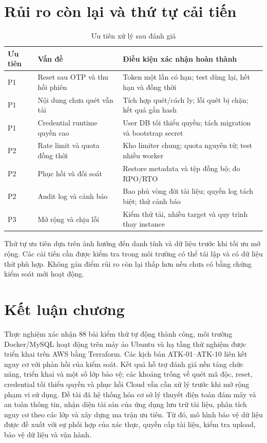 \section{Rủi ro còn lại và thứ tự cải tiến}
\begin{table}[htbp]\centering\small
\caption{Ưu tiên xử lý sau đánh giá}
\begin{tabularx}{\textwidth}{P{1.6cm}P{4.2cm}X}\toprule
\textbf{Ưu tiên}&\textbf{Vấn đề}&\textbf{Điều kiện xác nhận hoàn thành}\\\midrule
P1 & Reset sau OTP và thu hồi phiên & Token một lần có hạn; test dùng lại, hết hạn và đồng thời\\
P1 & Nội dung chưa quét vẫn tải & Tích hợp quét/cách ly; lỗi quét bị chặn; kết quả gắn hash\\
P1 & Credential runtime quyền cao & User DB tối thiểu quyền; tách migration và bootstrap secret\\
P2 & Rate limit và quota đồng thời & Kho limiter chung; quota nguyên tử; test nhiều worker\\
P2 & Phục hồi và đối soát & Restore metadata và tệp đồng bộ; đo RPO/RTO\\
P2 & Audit log và cảnh báo & Bao phủ vòng đời tài liệu; quyền log tách biệt; thử cảnh báo\\
P3 & Mở rộng và chịu lỗi & Kiểm thử tải, nhiều target và quy trình thay instance\\\bottomrule
\end{tabularx}\end{table}
Thứ tự ưu tiên dựa trên ảnh hưởng đến danh tính và dữ liệu trước khi tối ưu mở rộng. Các cải tiến cần được kiểm tra trong môi trường có thể tái lập và có dữ liệu thử phù hợp. Không gán điểm rủi ro còn lại thấp hơn nếu chưa có bằng chứng kiểm soát mới hoạt động.

\section{Kết luận chương}
Thực nghiệm xác nhận 88 bài kiểm thử tự động thành công, môi trường Docker/MySQL hoạt động trên máy ảo Ubuntu và hạ tầng thử nghiệm được triển khai trên AWS bằng Terraform. Các kịch bản ATK-01--ATK-10 liên kết nguy cơ với phản hồi của kiểm soát. Kết quả hỗ trợ đánh giá nền tảng chức năng, triển khai và một số lớp bảo vệ; các khoảng trống về quét mã độc, reset, credential tối thiểu quyền và phục hồi Cloud vẫn cần xử lý trước khi mở rộng phạm vi sử dụng.
Đề tài đã hệ thống hóa cơ sở lý thuyết điện toán đám mây và an toàn thông tin, nhận diện tài sản của ứng dụng lưu trữ tài liệu, phân tích nguy cơ theo các lớp và xây dựng ma trận ưu tiên. Từ đó, mô hình bảo vệ dữ liệu được đề xuất với sự phối hợp của xác thực, quyền cấp tài liệu, kiểm tra upload, bảo vệ dữ liệu và vận hành.

